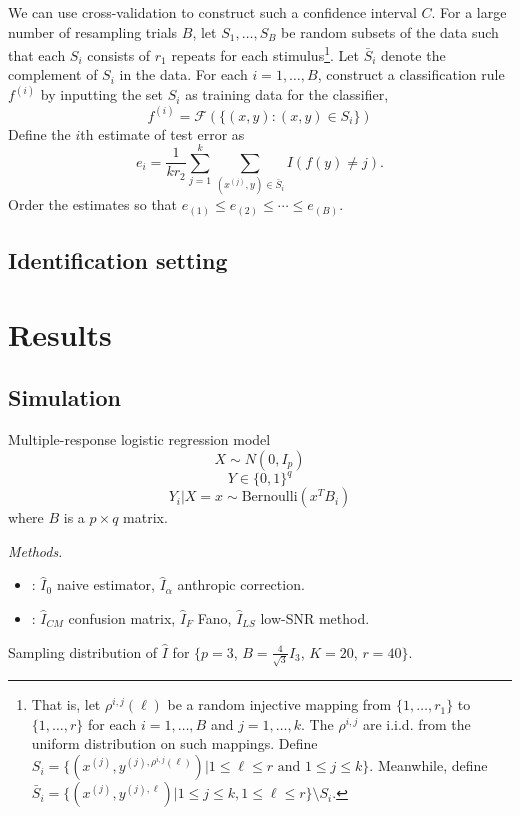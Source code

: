 \documentclass[12pt]{article}
\begin{document}
We can use cross-validation to construct such a confidence interval
$C$.  For a large number of resampling trials $B$, let $S_1,\hdots,
S_B$ be random subsets of the data such that each $S_i$ consists of
$r_1$ repeats for each stimulus\footnote{ That is, let $\rho^{i,
j}(\ell)$ be a random injective mapping from $\{1,\hdots, r_1\}$ to
$\{1,\hdots, r\}$ for each $i = 1,\hdots, B$ and $j = 1,\hdots, k$.
The $\rho^{i,j}$ are i.i.d. from the uniform distribution on such
mappings.  Define $S_i = \{(x^{(j)}, y^{(j), \rho^{i, j}(\ell)})|
1 \leq \ell\leq r \text{ and }1\leq j \leq k\}$. Meanwhile, define
$\bar{S}_i = \{(x^{(j)}, y^{(j), \ell})|1\leq j\leq k, 1\leq \ell \leq
r\}\setminus S_i$. }.  Let $\bar{S}_i$ denote the complement of $S_i$
in the data.  For each $i = 1,\hdots, B$, construct a classification
rule $f^{(i)}$ by inputting the set $S_i$ as training data for the
classifier,
\[
f^{(i)} = \mathcal{F}(\{(x, y): (x, y) \in S_i\})
\]
Define the $i$th estimate of test error
as
\[
e_i = \frac{1}{kr_2} \sum_{j=1}^{k}\sum_{(x^{(j)}, y) \in \bar{S}_i} I(f(y) \neq j).
\]
Order the estimates so that $e_{(1)} \leq e_{(2)} \leq \cdots \leq e_{(B)}$.



\subsection{Identification setting}


\section{Results}

\subsection{Simulation}

Multiple-response logistic regression model
\[
X \sim N(0, I_p)
\]
\[
Y \in \{0,1\}^q
\]
\[
Y_i|X = x \sim \text{Bernoulli}(x^T B_i)
\]
where $B$ is a $p \times q$ matrix.

\emph{Methods.}
\begin{itemize}
\item {}: $\hat{I}_0$ naive estimator, $\hat{I}_\alpha$ anthropic correction.
\item {}: $\hat{I}_{CM}$ confusion matrix, $\hat{I}_F$ Fano, $\hat{I}_{LS}$ low-SNR method.
\end{itemize}

Sampling distribution of $\hat{I}$ for \small{$\{p = 3$, $B = \frac{4}{\sqrt{3}} I_3$, $K = 20$, $r = 40\}$.}
\end{document}
